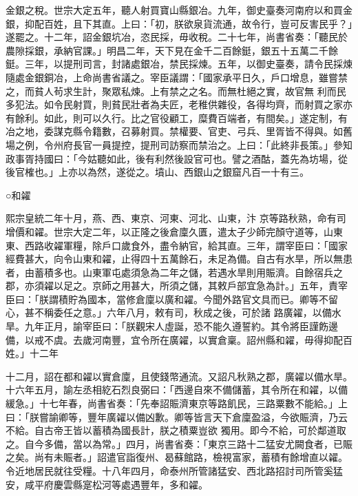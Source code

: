 \begin{pinyinscope}
 金銀之稅。世宗大定五年，聽人射買寶山縣銀冶。九年，御史臺奏河南府以和買金銀，抑配百姓，且下其直。上曰：「初，朕欲泉貨流通，故令行，豈可反害民乎？」遂罷之。十二年，詔金銀坑冶，恣民採，毋收稅。二十七年，尚書省奏：「聽民於農隙採銀，承納官課。」明昌二年，天下見在金千二百餘鋌，銀五十五萬二千餘鋌。三年，以提刑司言，封諸處銀冶，禁民採煉。五年，以御史臺奏，請令民採煉隨處金銀銅冶，上命尚書省議之。宰臣議謂：「國家承平日久，戶口增息，雖嘗禁之，而貧人茍求生計，聚眾私煉。上有禁之之名。而無杜絕之實，故官無
 利而民多犯法。如令民射買，則貧民壯者為夫匠，老稚供雜役，各得均齊，而射買之家亦有餘利。如此，則可以久行。比之官役顧工，糜費百端者，有間矣。」遂定制，有冶之地，委謀克縣令籍數，召募射買。禁權要、官吏、弓兵、里胥皆不得與。如舊場之例，令州府長官一員提控，提刑司訪察而禁治之。上曰：「此終非長策。」參知政事胥持國曰：「今姑聽如此，後有利然後設官可也。譬之酒酤，蓋先為坊場，從後官榷也。」上亦以為然，遂從之。墳山、西銀山之銀窟凡百一十有三。



 ○和糴



 熙宗皇統二年十月，燕、西、東京、河東、河北、山東，汴
 京等路秋熟，命有司增價和糴。世宗大定二年，以正隆之後倉廩久匱，遣太子少師完顏守道等，山東東、西路收糴軍糧，除戶口歲食外，盡令納官，給其直。三年，謂宰臣曰：「國家經費甚大，向令山東和糴，止得四十五萬餘石，未足為備。自古有水旱，所以無患者，由蓄積多也。山東軍屯處須急為二年之儲，若遇水旱則用賑濟。自餘宿兵之郡，亦須糴以足之。京師之用甚大，所須之儲，其敕戶部宜急為計。」五年，責宰臣曰：「朕謂積貯為國本，當修倉廩以廣和糴。今聞外路官文具而已。卿等不留心，甚不稱委任之意。」六年八月，敕有司，秋成之後，可於諸
 路廣糴，以備水旱。九年正月，諭宰臣曰：「朕觀宋人虛誕，恐不能久遵誓約。其令將臣謹飭邊備，以戒不虞。去歲河南豐，宜令所在廣糴，以實倉稟。詔州縣和糴，毋得抑配百姓。」十二年



 十二月，詔在都和糴以實倉廩，且使錢幣通流。又詔凡秋熟之郡，廣糴以備水旱。十六年五月，諭左丞相紇石烈良弼曰：「西邊自來不備儲蓄，其令所在和糴，以備緩急。」十七年春，尚書省奏：「先奉詔賑濟東京等路飢民，三路粟數不能給。」上曰：「朕嘗諭卿等，豐年廣糴以備凶歉。卿等皆言天下倉廩盈溢，今欲賑濟，乃云不給。自古帝王皆以蓄積為國長計，朕之積粟豈欲
 獨用。即今不給，可於鄰道取之。自今多備，當以為常。」四月，尚書省奏：「東京三路十二猛安尤闕食者，已賑之矣。尚有未賑者。」詔遣官詣復州、曷蘇館路，檢視富家，蓄積有餘增直以糴。令近地居民就往受糧。十八年四月，命泰州所管諸猛安、西北路招討司所管奚猛安，咸平府慶雲縣寔松河等處遇豐年，多和糴。




\end{pinyinscope}
